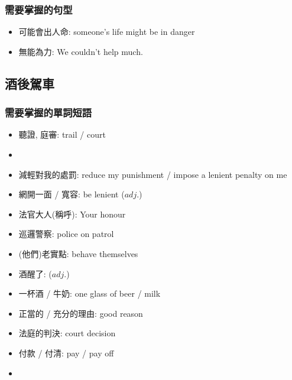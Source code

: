\subsubsection*{需要掌握的句型}
\begin{itemize}
  \itemsep0em
  \item 可能會出人命: someone's life might be in danger
  \item 無能為力: We couldn't help much.
\end{itemize}

\subsection{酒後駕車}
\subsubsection*{需要掌握的單詞短語}
\begin{multicols}{2}
\begin{itemize}
  \itemsep0em
  \item 聽證, 庭審: trail / court 
  \item {}
  \item 減輕對我的處罰: reduce my punishment / impose a lenient penalty on me
  \item 網開一面 / 寬容: be lenient ($adj.$)
  \item 法官大人(稱呼): Your honour
  \item 巡邏警察: police on patrol
  \item (他們)老實點: behave themselves
  \item 酒醒了:  ($adj.$)
  \item 一杯酒 / 牛奶: one glass of beer / milk
  \item 正當的 / 充分的理由: good reason
  \item 法庭的判決: court decision
  \item 付款 / 付清: pay / pay off
  \item {}
\end{itemize}
\end{multicols}

